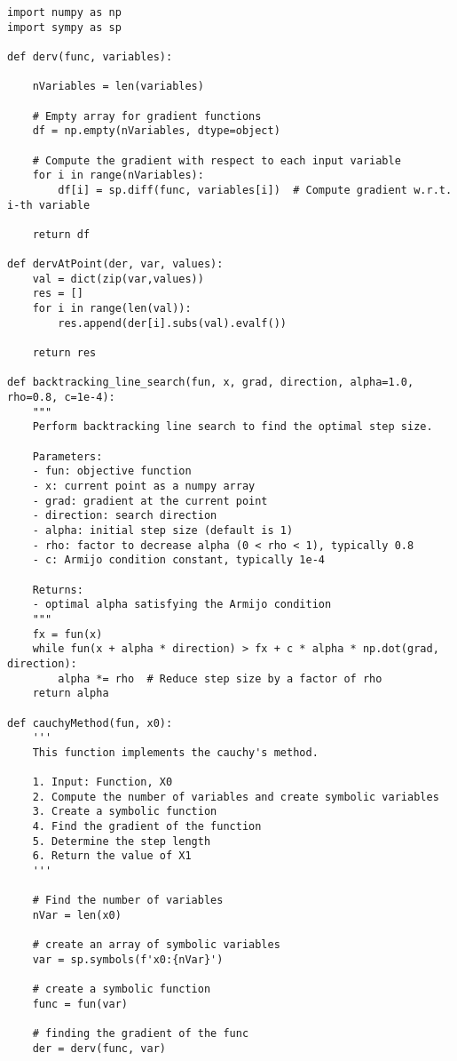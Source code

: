 \documentclass[12pt,a4paper,oneside]{paper} %
\begin{document}
\begin{verbatim}
import numpy as np
import sympy as sp

def derv(func, variables):

    nVariables = len(variables)

    # Empty array for gradient functions
    df = np.empty(nVariables, dtype=object)  

    # Compute the gradient with respect to each input variable
    for i in range(nVariables):
        df[i] = sp.diff(func, variables[i])  # Compute gradient w.r.t. i-th variable

    return df

def dervAtPoint(der, var, values):
    val = dict(zip(var,values))  
    res = []
    for i in range(len(val)):
        res.append(der[i].subs(val).evalf())

    return res

def backtracking_line_search(fun, x, grad, direction, alpha=1.0, rho=0.8, c=1e-4):
    """
    Perform backtracking line search to find the optimal step size.
    
    Parameters:
    - fun: objective function
    - x: current point as a numpy array
    - grad: gradient at the current point
    - direction: search direction
    - alpha: initial step size (default is 1)
    - rho: factor to decrease alpha (0 < rho < 1), typically 0.8
    - c: Armijo condition constant, typically 1e-4

    Returns:
    - optimal alpha satisfying the Armijo condition
    """
    fx = fun(x)
    while fun(x + alpha * direction) > fx + c * alpha * np.dot(grad, direction):
        alpha *= rho  # Reduce step size by a factor of rho
    return alpha

def cauchyMethod(fun, x0):
    '''
    This function implements the cauchy's method.

    1. Input: Function, X0
    2. Compute the number of variables and create symbolic variables
    3. Create a symbolic function
    4. Find the gradient of the function
    5. Determine the step length
    6. Return the value of X1
    '''

    # Find the number of variables
    nVar = len(x0)

    # create an array of symbolic variables
    var = sp.symbols(f'x0:{nVar}')

    # create a symbolic function
    func = fun(var)

    # finding the gradient of the func
    der = derv(func, var)


\end{verbatim}
\end{document}
